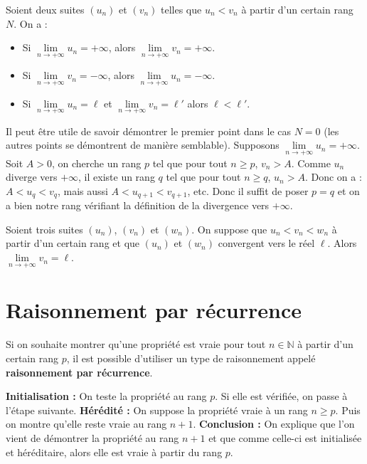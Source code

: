 	\begin{formula}
		Soient deux suites $(u_n)$ et $(v_n)$ telles que $u_n < v_n$ à partir d'un certain rang $N$. On a :
		\begin{itemize}
			\item Si $\lim\limits_{n \rightarrow +\infty} u_n = +\infty$, alors $\lim\limits_{n \rightarrow +\infty} v_n = +\infty$.
			\item Si $\lim\limits_{n \rightarrow +\infty} v_n = -\infty$, alors $\lim\limits_{n \rightarrow +\infty} u_n = -\infty$.
			\item Si $\lim\limits_{n \rightarrow +\infty} u_n = \ell$ et $\lim\limits_{n \rightarrow +\infty} v_n = \ell'$ alors $\ell < \ell'$.
		\end{itemize}
	\end{formula}
	
	\begin{demonstration}
		Il peut être utile de savoir démontrer le premier point dans le cas $N = 0$ (les autres points se démontrent de manière semblable). Supposons $\lim\limits_{n \rightarrow +\infty} u_n = +\infty$. Soit $A > 0$, on cherche un rang $p$ tel que pour tout $n \geq p$, $v_n > A$.
		\newpar
		Comme $u_n$ diverge vers $+\infty$, il existe un rang $q$ tel que pour tout $n \geq q$, $u_n > A$. Donc on a : $A < u_q < v_q$, mais aussi $A < u_{q+1} < v_{q+1}$, etc.
		\newpar
		Donc il suffit de poser $p = q$ et on a bien notre rang vérifiant la définition de la divergence vers $+\infty$.
	\end{demonstration}
	
	\begin{formula}
		Soient trois suites $(u_n)$, $(v_n)$ et $(w_n)$. On suppose que $u_n < v_n < w_n$ à partir d'un certain rang et que $(u_n)$ et $(w_n)$ convergent vers le réel $\ell$.
		\newpar
		Alors $\lim\limits_{n \rightarrow +\infty} v_n = \ell$.
	\end{formula}
	
	\section{Raisonnement par récurrence}
	
	Si on souhaite montrer qu'une propriété est vraie pour tout $n \in \mathbb{N}$ à partir d'un certain rang $p$, il est possible d'utiliser un type de raisonnement appelé \textbf{raisonnement par récurrence}.
	
	\begin{formula}
		\textbf{Initialisation :} On teste la propriété au rang $p$. Si elle est vérifiée, on passe à l'étape suivante.
		\newpar
		\textbf{Hérédité :} On suppose la propriété vraie à un rang $n \geq p$. Puis on montre qu'elle reste vraie au rang $n+1$.
		\newpar
		\textbf{Conclusion :} On explique que l'on vient de démontrer la propriété au rang $n+1$ et que comme celle-ci est initialisée et héréditaire, alors elle est vraie à partir du rang $p$.
	\end{formula}
	
